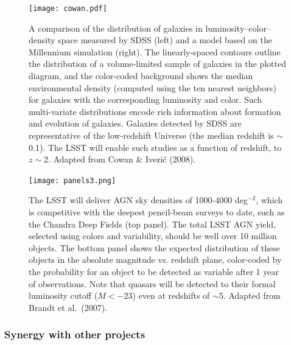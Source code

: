 \begin{figure}
\texttt{[image: cowan.pdf]}
\caption{A comparison of the distribution of galaxies in  
luminosity--color--density space measured by SDSS (left) and a model based
on the Millennium simulation (right). The linearly-spaced contours outline
the distribution of a volume-limited sample of galaxies in the plotted diagram, and
the color-coded background shows the median environmental density (computed
using the ten nearest neighbors) for galaxies
with the corresponding luminosity and color. Such multi-variate distributions
encode rich information about formation and evolution of galaxies. Galaxies 
detected by SDSS are representative of the low-redshift Universe (the median 
redshift is $\sim$0.1). The LSST will enable such studies as a function of 
redshift, to $z\sim$2. Adapted from Cowan \& Ivezi\'{c} 
(2008).} 
\label{Fig:cowan}
\end{figure}


\begin{figure}
\texttt{[image: panels3.png]}
\caption{The LSST will deliver AGN sky densities of 1000-4000 deg$^{-2}$, which is 
competitive with the deepest pencil-beam surveys to date, such as the Chandra
Deep Fields (top panel). The total LSST AGN yield, selected using colors and
variability, should be well over 10 million objects. 
The bottom panel shows the expected distribution of these objects in the 
absolute magnitude vs. redshift plane, color-coded by the probability for
an object to be
detected as variable after 1 year of observations. Note that quasars will
be detected to their formal luminosity cutoff ($M< -23$) even at redshifts
of $\sim$5. Adapted from Brandt et al.~(2007).} 
\label{Fig:panels3}
\end{figure}

\subsubsection{  Synergy with other projects }

